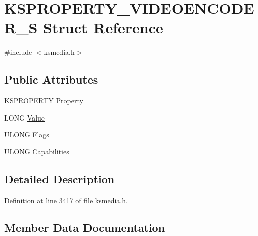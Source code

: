 \hypertarget{struct_k_s_p_r_o_p_e_r_t_y___v_i_d_e_o_e_n_c_o_d_e_r___s}{}\section{K\+S\+P\+R\+O\+P\+E\+R\+T\+Y\+\_\+\+V\+I\+D\+E\+O\+E\+N\+C\+O\+D\+E\+R\+\_\+S Struct Reference}
\label{struct_k_s_p_r_o_p_e_r_t_y___v_i_d_e_o_e_n_c_o_d_e_r___s}


{\ttfamily \#include $<$ksmedia.\+h$>$}

\subsection*{Public Attributes}
\begin{DoxyCompactItemize}
\item 
\hyperlink{ks_8h_a4392f77c74e868d813d46c39ada4d660}{K\+S\+P\+R\+O\+P\+E\+R\+TY} \hyperlink{struct_k_s_p_r_o_p_e_r_t_y___v_i_d_e_o_e_n_c_o_d_e_r___s_ab09714314f816d1af281e0862eeba830}{Property}
\item 
L\+O\+NG \hyperlink{struct_k_s_p_r_o_p_e_r_t_y___v_i_d_e_o_e_n_c_o_d_e_r___s_aaa1afd83526658c875f44cce28fe7fbc}{Value}
\item 
U\+L\+O\+NG \hyperlink{struct_k_s_p_r_o_p_e_r_t_y___v_i_d_e_o_e_n_c_o_d_e_r___s_a4062339e269c8e7791a7ba7b7367fcc8}{Flags}
\item 
U\+L\+O\+NG \hyperlink{struct_k_s_p_r_o_p_e_r_t_y___v_i_d_e_o_e_n_c_o_d_e_r___s_a4ddddfafae3ce0d9f7eaaf366d1c196a}{Capabilities}
\end{DoxyCompactItemize}


\subsection{Detailed Description}


Definition at line 3417 of file ksmedia.\+h.



\subsection{Member Data Documentation}
